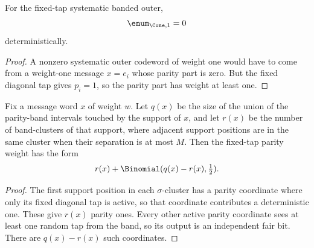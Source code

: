 \begin{lemma}
\label{lem:outer-fixedtap-no-weight-one}
For the fixed-tap systematic banded outer,
\[
\enum_{\Cone,1}=0
\]
deterministically.
\end{lemma}

\begin{proof}
A nonzero systematic outer codeword of weight one would have to come from a weight-one message \(x=e_i\) whose parity
part is zero. But the fixed diagonal tap gives \(p_i=1\), so the parity part has weight at least one.
\end{proof}

\begin{lemma}
\label{lem:outer-fixedtap-banded-lowweight-law}
Fix a message word \(x\) of weight \(w\). Let \(q(x)\) be the size of the union of the parity-band intervals touched by
the support of \(x\), and let \(r(x)\) be the number of band-clusters of that support, where adjacent support positions
are in the same cluster when their separation is at most \(M\). Then the fixed-tap parity weight
has the form
\[
r(x)+\Binomial(q(x)-r(x),\tfrac12).
\]
\end{lemma}

\begin{proof}
The first support position in each \(\sigma\)-cluster has a parity coordinate where only its fixed diagonal tap is
active, so that coordinate contributes a deterministic one. These give \(r(x)\) parity ones. Every other active parity
coordinate sees at least one random tap from the band, so its output is an independent fair bit. There are
\(q(x)-r(x)\) such coordinates.
\end{proof}
